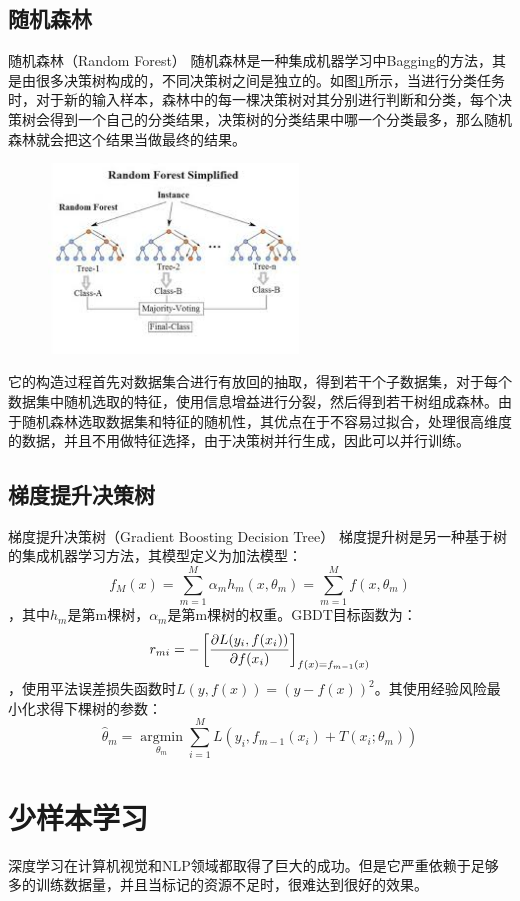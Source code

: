 \subsection{随机森林}
随机森林（Random Forest）\cite{liaw2002classification}
随机森林是一种集成机器学习中Bagging的方法，其是由很多决策树构成的，不同决策树之间是独立的。如图\ref{fig:rf-model}所示，当进行分类任务时，对于新的输入样本，森林中的每一棵决策树对其分别进行判断和分类，每个决策树会得到一个自己的分类结果，决策树的分类结果中哪一个分类最多，那么随机森林就会把这个结果当做最终的结果。
\begin{figure}[htb]
    \centering
    \includegraphics[width=0.6\textwidth]{Img/rf-model.jpg}
    \label{fig:rf-model}
\end{figure}
它的构造过程首先对数据集合进行有放回的抽取，得到若干个子数据集，对于每个数据集中随机选取的特征，使用信息增益进行分裂，然后得到若干树组成森林。由于随机森林选取数据集和特征的随机性，其优点在于不容易过拟合，处理很高维度的数据，并且不用做特征选择，由于决策树并行生成，因此可以并行训练。

\subsection{梯度提升决策树}
梯度提升决策树（Gradient Boosting Decision Tree）\cite{ke2017lightgbm}
梯度提升树是另一种基于树的集成机器学习方法，其模型定义为加法模型：
$$f_M(x)=\sum^M_{m=1}\alpha_mh_m(x,\theta_m)=\sum^M_{m=1}f(x,\theta_m)$$，其中$h_m$是第m棵树，$\alpha_m$是第m棵树的权重。GBDT目标函数为：
$$\large {r_{mi}} = -\left[\frac{\partial L(y_i,f(x_i))}{\partial f(x_i)} \right]_{f(x)=f_{m-1}(x)}$$，使用平法误差损失函数时$L(y, f(x)) = (y-f(x))^2$。其使用经验风险最小化求得下棵树的参数：
$$\hat \theta_{m} = \mathop{\arg\min}\limits_{\theta_{m}} \sum_{i=1}^ML(y_{i}, f_{m-1}(x_{i})+T(x_{i}; \theta_{m}))$$

\section{少样本学习}
深度学习在计算机视觉和NLP领域都取得了巨大的成功。但是它严重依赖于足够多的训练数据量，并且当标记的资源不足时，很难达到很好的效果。

